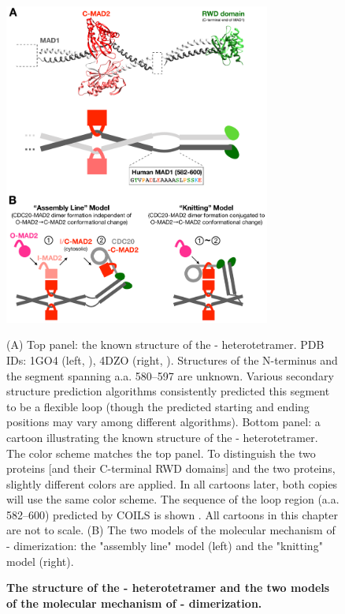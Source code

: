 \begin{figure}
    \centering
    \includegraphics[width=0.78\textwidth]{chapters/figures/MAD1C+KnittingModel.pdf}
    \caption{\textbf{The structure of the - heterotetramer and the two models of the molecular mechanism of - dimerization.}}
    \noindent\justifying (A) Top panel: the known structure of the - heterotetramer. PDB IDs: 1GO4 (left, \cite{Structure1GO4}), 4DZO (right, \cite{Structure4DZO}). Structures of the N-terminus and the segment spanning a.a. 580--597 are unknown. Various secondary structure prediction algorithms consistently predicted this segment to be a flexible loop (though the predicted starting and ending positions may vary among different algorithms). Bottom panel: a cartoon illustrating the known structure of the - heterotetramer. The color scheme matches the top panel. To distinguish the two  proteins [and their C-terminal RWD domains] and the two  proteins, slightly different colors are applied. In all cartoons later, both copies will use the same color scheme. The sequence of the loop region (a.a. 582--600) predicted by COILS is shown \cite{LupasCOILS}. All cartoons in this chapter are not to scale. (B) The two models of the molecular mechanism of - dimerization: the "assembly line" model (left) and the "knitting" model (right).
    \label{MAD1C+KnittingModel}
\end{figure}

